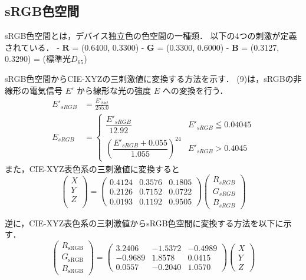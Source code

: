 \documentclass[
]{article}
\begin{document}
\hypertarget{srgbux8272ux7a7aux9593}{%
\subsection{sRGB色空間}\label{srgbux8272ux7a7aux9593}}

sRGB色空間とは，デバイス独立色の色空間の一種類．
以下の4つの刺激が定義されている． - \(\textbf{R}\) = (0.6400, 0.3300) -
\(\textbf{G}\) = (0.3300, 0.6000) - \(\textbf{B}\) = (0.3127, 0.3290) =
(標準光\(D_{65}\))

sRGB色空間からCIE-XYZの三刺激値に変換する方法を示す．
(9)は，sRGBの非線形の電気信号 \(E'\) から線形な光の強度 \(E\)
への変換を行う．
\begin{equation}
\begin{aligned}
E'_{sRGB} &= \frac{E'_{8bit}}{255.0} \\
E_{sRGB} &=
\begin{cases}
\dfrac{E'_{sRGB}}{12.92} & E'_{sRGB} \leqq 0.04045 \\
\left(\dfrac{E'_{sRGB} + 0.055}{1.055}\right)^{24} &E'_{sRGB} > 0.4045
\end{cases}
\end{aligned}
\end{equation}
また，CIE-XYZ表色系の三刺激値に変換すると 
\begin{equation}
\begin{pmatrix}
X \\
Y \\
Z \\
\end{pmatrix}
=
\begin{pmatrix}
0.4124 & 0.3576 & 0.1805 \\
0.2126 & 0.7152 & 0.0722 \\
0.0193 & 0.1192 & 0.9505 
\end{pmatrix}
\begin{pmatrix}
R_{sRGB} \\
G_{sRGB} \\
B_{sRGB}
\end{pmatrix}
\end{equation}

逆に，CIE-XYZ表色系の三刺激値からsRGB色空間に変換する方法を以下に示す．
\begin{equation}
\begin{pmatrix}
R_{\text{sRGB}} \\
G_{\text{sRGB}} \\
B_{\text{sRGB}}
\end{pmatrix}
=
\begin{pmatrix}
3.2406 & -1.5372 & -0.4989 \\
-0.9689 & 1.8578 & 0.0415 \\
0.0557 & -0.2040 & 1.0570
\end{pmatrix}
\begin{pmatrix}
X \\
Y \\
Z
\end{pmatrix}
\end{equation}
\end{document}
